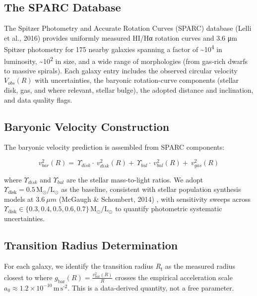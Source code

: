 \documentclass[11pt]{article}
\begin{document}
\subsection{The SPARC Database}\label{the-sparc-database}

The Spitzer Photometry and Accurate Rotation Curves (SPARC) database (Lelli et al., 2016) provides uniformly measured HI/Hα rotation curves and 3.6 μm Spitzer photometry for 175 nearby galaxies spanning a factor of \textasciitilde10\textsuperscript{4} in luminosity, \textasciitilde10\textsuperscript{2} in size, and a wide range of morphologies (from gas-rich dwarfs to massive spirals). Each galaxy entry includes the observed circular velocity \(V_{obs}(R)\) with uncertainties, the baryonic rotation-curve components (stellar disk, gas, and where relevant, stellar bulge), the adopted distance and inclination, and data quality flags.

\subsection{Baryonic Velocity Construction}\label{baryonic-velocity-construction}

The baryonic velocity prediction is assembled from SPARC components:

\[v_{bar}^{2}(R) = \ \Upsilon_{disk} \cdot \ v_{disk}^{2}(R) + \ \Upsilon_{bul} \cdot \ v_{bul}^{2}(R) + \ v_{gas}^{2}(R)\]

where \(\Upsilon_{disk}\) and \(\Upsilon_{bul}\) are the stellar mass-to-light ratios. We adopt \(\Upsilon_{\text{disk}} = 0.5\,\text{M}_{\text{⊙}}\text{/}\text{L}_{\text{⊙}}\) as the baseline, consistent with stellar population synthesis models at \(3.6\ \mu m\) (McGaugh \& Schombert, 2014) \citep{McGaughSchombert2014ML}, with sensitivity sweeps across \(\Upsilon_{\text{disk}} \in \text{\{}0.3,0.4,0.5,0.6,0.7\text{\}}\,\text{M}_{\text{⊙}}\text{/}\text{L}_{\text{⊙}}\) to quantify photometric systematic uncertainties.

\subsection{Transition Radius Determination}\label{transition-radius-determination}

For each galaxy, we identify the transition radius \emph{R}\textsubscript{t} as the measured radius closest to where \(g_{\text{bar}}(R) = \frac{v_{\text{bar}}^{2}(R)}{R}\) crosses the empirical acceleration scale \(a_{0} \approx 1.2 \times 10^{- 10}\,\text{m}\,\text{s}^{\text{-2}}\). This is a data-derived quantity, not a free parameter.
\end{document}
